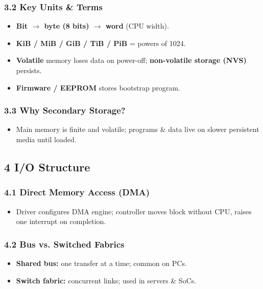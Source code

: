 \documentclass{article}
\begin{document}
\subsubsection*{3.2 Key Units \& Terms}
\begin{itemize}
    \item \textbf{Bit $\rightarrow$ byte (8 bits) $\rightarrow$ word} (CPU width).
    \item \textbf{KiB / MiB / GiB / TiB / PiB} = powers of 1024.
    \item \textbf{Volatile} memory loses data on power-off; \textbf{non-volatile storage (NVS)} persists.
    \item \textbf{Firmware / EEPROM} stores bootstrap program.
\end{itemize}

\subsubsection*{3.3 Why Secondary Storage?}
\begin{itemize}
    \item Main memory is finite and volatile; programs \& data live on slower persistent media until loaded.
\end{itemize}

\subsection*{4 I/O Structure}
\subsubsection*{4.1 Direct Memory Access (DMA)}
\begin{itemize}
    \item Driver configures DMA engine; controller moves block without CPU, raises one interrupt on completion.
\end{itemize}

\subsubsection*{4.2 Bus vs. Switched Fabrics}
\begin{itemize}
    \item \textbf{Shared bus:} one transfer at a time; common on PCs.
    \item \textbf{Switch fabric:} concurrent links; used in servers \& SoCs.
\end{itemize}
\end{document}
